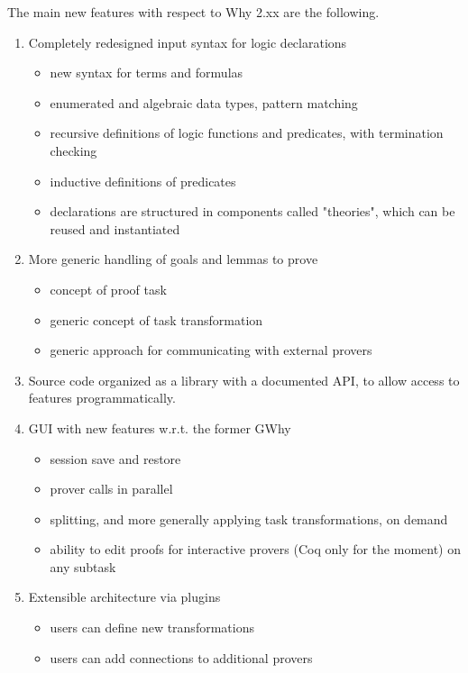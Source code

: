 \documentclass[a4paper,11pt,twoside,openright]{memoir}
\begin{document}
The main new features with respect to Why 2.xx
are the following.
\begin{enumerate}
\item Completely redesigned input syntax for logic declarations
  \begin{itemize}
  \item new syntax for terms and formulas
  \item enumerated and algebraic data types, pattern matching
  \item recursive definitions of logic functions and predicates, with
    termination checking
  \item inductive definitions of predicates
  \item declarations are structured in components called "theories",
    which can be reused and instantiated
  \end{itemize}

\item More generic handling of goals and lemmas to prove
  \begin{itemize}
  \item concept of proof task
  \item generic concept of task transformation
  \item generic approach for communicating with external provers
  \end{itemize}
\item Source code organized as a library with a documented API, to
  allow access to \why features programmatically.

\item GUI with new features w.r.t. the former GWhy
  \begin{itemize}
  \item session save and restore
  \item prover calls in parallel
  \item splitting, and more generally applying task transformations,
    on demand
  \item ability to edit proofs for interactive provers (Coq only for
    the moment) on any subtask
  \end{itemize}
\item Extensible architecture via plugins
  \begin{itemize}
  \item users can define new transformations
  \item users can add connections to additional provers
  \end{itemize}
\end{enumerate}
\end{document}

